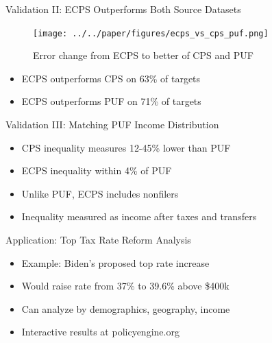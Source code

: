 \documentclass{beamer}
\begin{document}
\begin{frame}{Validation II: ECPS Outperforms Both Source Datasets}
    \begin{figure}
        \centering
        \texttt{[image: ../../paper/figures/ecps\_vs\_cps\_puf.png]}
        \caption{Error change from ECPS to better of CPS and PUF}
    \end{figure}
    \begin{itemize}
        \item ECPS outperforms CPS on 63\% of targets
        \item ECPS outperforms PUF on 71\% of targets
    \end{itemize}
\end{frame}

\begin{frame}{Validation III: Matching PUF Income Distribution}
    \begin{table}
        \centering
        
    \end{table}
    \begin{itemize}
        \item CPS inequality measures 12-45\% lower than PUF
        \item ECPS inequality within 4\% of PUF
        \item Unlike PUF, ECPS includes nonfilers
        \item Inequality measured as income after taxes and transfers
    \end{itemize}
\end{frame}

\begin{frame}{Application: Top Tax Rate Reform Analysis}
    \begin{itemize}
        \item Example: Biden's proposed top rate increase
        \item Would raise rate from 37\% to 39.6\% above \$400k
    \end{itemize}
    \begin{table}
        \centering
        
    \end{table}
    \begin{itemize}
        \item Can analyze by demographics, geography, income
        \item Interactive results at policyengine.org
    \end{itemize}
\end{frame}
\end{document}
